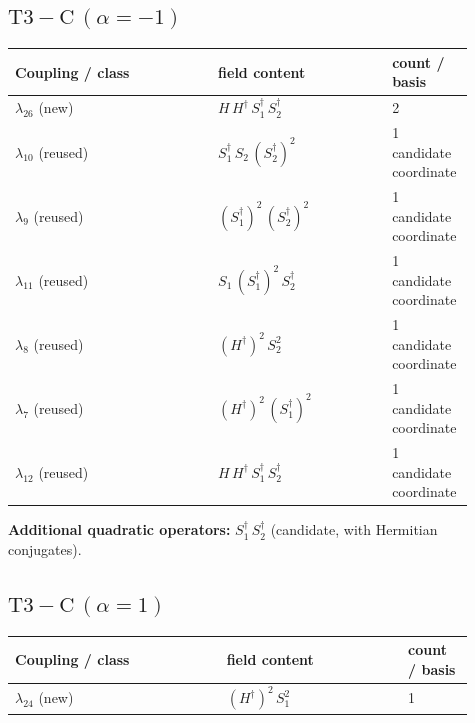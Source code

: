 \documentclass[9pt,a4paper]{article}
\begin{document}
\subsection*{$ \mathrm{T3-C}\,(\alpha=-1) $}
\begin{longtable}{@{}p{0.42\linewidth}p{0.36\linewidth}p{0.13\linewidth}@{}}
\toprule
Coupling / class & field content & count / basis\\
\midrule
\endhead
$\lambda_{26}$ (new) & $H\, H^\dagger\, S_1^\dagger\, S_2^\dagger$ & 2 \\
$\lambda_{10}$ (reused) & $S_1^\dagger\, S_2\, \left(S_2^\dagger\right)^{2}$ & 1 candidate coordinate \\
$\lambda_{9}$ (reused) & $\left(S_1^\dagger\right)^{2}\, \left(S_2^\dagger\right)^{2}$ & 1 candidate coordinate \\
$\lambda_{11}$ (reused) & $S_1\, \left(S_1^\dagger\right)^{2}\, S_2^\dagger$ & 1 candidate coordinate \\
$\lambda_{8}$ (reused) & $\left(H^\dagger\right)^{2}\, S_2^{2}$ & 1 candidate coordinate \\
$\lambda_{7}$ (reused) & $\left(H^\dagger\right)^{2}\, \left(S_1^\dagger\right)^{2}$ & 1 candidate coordinate \\
$\lambda_{12}$ (reused) & $H\, H^\dagger\, S_1^\dagger\, S_2^\dagger$ & 1 candidate coordinate \\
\bottomrule
\end{longtable}
\textbf{Additional quadratic operators:}
$S_1^\dagger\, S_2^\dagger$ (candidate, with Hermitian conjugates).
\subsection*{$ \mathrm{T3-C}\,(\alpha=1) $}
\begin{longtable}{@{}p{0.42\linewidth}p{0.36\linewidth}p{0.13\linewidth}@{}}
\toprule
Coupling / class & field content & count / basis\\
\midrule
\endhead
$\lambda_{24}$ (new) & $\left(H^\dagger\right)^{2}\, S_1^{2}$ & 1 \\
\bottomrule
\end{longtable}
\end{document}
